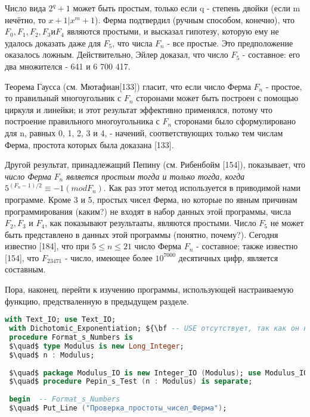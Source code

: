  \newpage
 Число вида $2^q + 1$ может быть простым, только если q -  степень двойки (если m нечётно, то $x + 1 | x^m + 1$). Ферма подтвердил (ручным способом, конечно), что $F_0, F_1, F_2, F_3 и F_4$ являются простыми, и высказал гипотезу, которую ему не удалось доказать даже для $F_5$, что  числа $F_n$ - все простые. Это предположение оказалось ложным. Действительно, Эйлер доказал, что число $F_5$ - составное: его два множителся - 641 и 6 700 417.
 \par Теорема Гаусса (см. Мютафиан[133]) гласит, что если число Ферма $F_n$ - простое, то правильный многоугольник с $F_n$ сторонами может быть построен с помощью циркуля и линейки; и этот результат эффективно применялся, потому что построение правильного многоугольника с $F_n$ сторонами было сформулировано для  n, равных 0, 1, 2, 3 и 4, - начений, соответствующих только тем числам Ферма, простота которых была доказана [133].
 \par Другой результат, принадлежащий Пепину (см. Рибенбойм [154]), показывает, что {\it число Ферма} $F_n$ {\it является простым тогда и только тогда, когда} $5^{(F_n - 1)/2} \equiv -1 (mod F_n)$.  Как раз этот метод используется в приводимой нами программе. Кроме 3 и 5, простых чисел Ферма, но которые по явным причинам программирования (каким?) не входят в набор данных этой программы, числа $F_2, F_3$ и $F_4$, как показывают результааты, являются простыми. Число $F_5$ не может быть представлено в данных этой программы (понятно, почему?). Сегодня известно [184], что при $5 \leqslant n \leqslant 21$  число Ферма $F_n$ - составное; также известно [154], что $F_23471$ - число, имеющее более $10^7000$ десятичных цифр, является составным.
 \par Пора, наконец, перейти к изучению программы, использующей настраиваемую функцию, предстваленную в предыдущем разделе.
 
 \begin{lstlisting}[mathescape=true, language=Ada, basicstyle=\small]
 with Text_IO; use Text_IO;
 with Dichotomic_Exponentiation; ${\bf -- USE отсутствует, так как он не имеет смысла}$
 procedure Format_s_Numbers is
 $\quad$ type Modulus is new Long_Integer;
 $\quad$ n : Modulus;
 
 $\quad$ package Modulus_IO is new Integer_IO (Modulus); use Modulus_IO;
 $\quad$ procedure Pepin_s_Test (n : Modulus) is separate;
 
 begin  -- Format_s_Numbers
 $\quad$ Put_Line ("Проверка_простоты_чисел_Ферма");
 \end{lstlisting}
 
